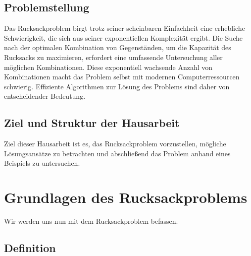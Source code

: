 \documentclass[12pt]{report}
\begin{document}
\section{Problemstellung}
Das Rucksackproblem birgt trotz seiner scheinbaren Einfachheit eine erhebliche Schwierigkeit, die sich aus seiner exponentiellen Komplexität ergibt. Die Suche nach der optimalen Kombination von Gegenständen, um die Kapazität des Rucksacks zu maximieren, erfordert eine umfassende Untersuchung aller möglichen Kombinationen. Diese exponentiell wachsende Anzahl von Kombinationen macht das Problem selbst mit modernen Computerressourcen schwierig. Effiziente Algorithmen zur Lösung des Problems sind daher von entscheidender Bedeutung.


\section{Ziel und Struktur der Hausarbeit}
Ziel dieser Hausarbeit ist es, das Rucksackproblem vorzustellen, mögliche Lösungsansätze zu betrachten und abschließend das Problem anhand eines Beispiels zu untersuchen. 


\newpage
\chapter{Grundlagen des Rucksackproblems}
Wir werden uns nun mit dem Rucksackproblem befassen.

\section{Definition}

\end{document}
